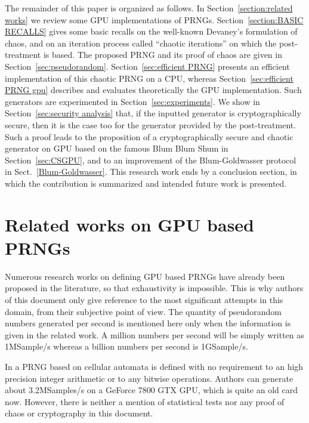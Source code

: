 \documentclass{article}
\begin{document}
The remainder of this paper  is organized as follows. In Section~\ref{section:related
  works} we  review some GPU implementations  of PRNGs.  Section~\ref{section:BASIC
  RECALLS} gives some basic recalls  on the well-known Devaney's formulation of chaos, 
  and on an iteration process called ``chaotic
iterations'' on which the post-treatment is based. 
The proposed PRNG and its proof of chaos are given in  Section~\ref{sec:pseudorandom}.
Section~\ref{sec:efficient    PRNG}   presents   an   efficient
implementation of  this chaotic PRNG  on a CPU, whereas   Section~\ref{sec:efficient PRNG
  gpu}   describes and evaluates theoretically  the  GPU   implementation. 
Such generators are experimented in 
Section~\ref{sec:experiments}.
We show in Section~\ref{sec:security analysis} that, if the inputted
generator is cryptographically secure, then it is the case too for the
generator provided by the post-treatment.
Such a proof leads to the proposition of a cryptographically secure and
chaotic generator on GPU based on the famous Blum Blum Shum
in Section~\ref{sec:CSGPU}, and to an improvement of the
Blum-Goldwasser protocol in Sect.~\ref{Blum-Goldwasser}.
This research work ends by a conclusion section, in which the contribution is
summarized and intended future work is presented.




\section{Related works on GPU based PRNGs}
\label{section:related works}

Numerous research works on defining GPU based PRNGs have already been proposed  in the
literature, so that exhaustivity is impossible.
This is why authors of this document only give reference to the most significant attempts 
in this domain, from their subjective point of view. 
The  quantity of pseudorandom numbers generated per second is mentioned here 
only when the information is given in the related work. 
A million numbers  per second will be simply written as
1MSample/s whereas a billion numbers per second is 1GSample/s.

In \cite{Pang:2008:cec}  a PRNG based on  cellular automata is defined
with no  requirement to an high  precision  integer   arithmetic  or to any bitwise
operations. Authors can   generate  about
3.2MSamples/s on a GeForce 7800 GTX GPU, which is quite an old card now.
However, there is neither a mention of statistical tests nor any proof of
chaos or cryptography in this document.
\end{document}
